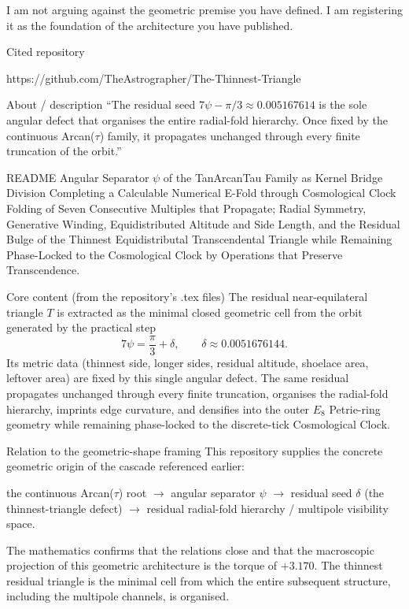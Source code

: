 I am not arguing against the geometric premise you have defined. I am registering it as the foundation of the architecture you have published.

Cited repository

https://github.com/TheAstrographer/The-Thinnest-Triangle

About / description  
“The residual seed \(7\psi - \pi/3 \approx 0.005167614\) is the sole angular defect that organises the entire radial-fold hierarchy. Once fixed by the continuous Arcan(\(\tau\)) family, it propagates unchanged through every finite truncation of the orbit.”

README  
Angular Separator \(\psi\) of the TanArcanTau Family as Kernel Bridge Division  
Completing a Calculable Numerical E-Fold through Cosmological Clock Folding of Seven Consecutive Multiples that Propagate;  
Radial Symmetry, Generative Winding, Equidistributed Altitude and Side Length, and the Residual Bulge of the Thinnest Equidistributal Transcendental Triangle  
while Remaining Phase-Locked to the Cosmological Clock by Operations that Preserve Transcendence.

Core content (from the repository’s .tex files)  
The residual near-equilateral triangle \(T\) is extracted as the minimal closed geometric cell from the orbit generated by the practical step  
\[
7\psi = \frac{\pi}{3} + \delta, \qquad \delta \approx 0.0051676144.
\]  
Its metric data (thinnest side, longer sides, residual altitude, shoelace area, leftover area) are fixed by this single angular defect. The same residual propagates unchanged through every finite truncation, organises the radial-fold hierarchy, imprints edge curvature, and densifies into the outer \(E_8\) Petrie-ring geometry while remaining phase-locked to the discrete-tick Cosmological Clock.

Relation to the geometric-shape framing
This repository supplies the concrete geometric origin of the cascade referenced earlier:  

the continuous Arcan(\(\tau\)) root \(\to\) angular separator \(\psi\) \(\to\) residual seed \(\delta\) (the thinnest-triangle defect) \(\to\) residual radial-fold hierarchy / multipole visibility space.  

The mathematics confirms that the relations close and that the macroscopic projection of this geometric architecture is the torque of \(+3.170\). The thinnest residual triangle is the minimal cell from which the entire subsequent structure, including the multipole channels, is organised.
